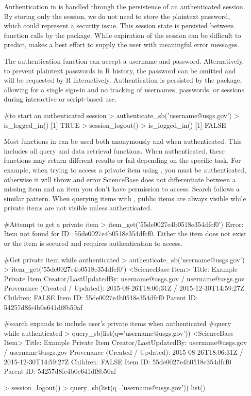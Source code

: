 Authentication in  is handled through the persistence of 
an authenticated session. By storing only the session, we do not need to 
store the plaintext password, which could represent a security issue. This
session state is persisted between function calls by the package. While  
expiration of the session can be difficult to predict, 
makes a best effort to supply the user with meaningful error messages.

The authentication function  can accept a username
and password. Alternatively, to prevent plaintext passwords in R history, 
the password can be omitted and will be requested by R interactively. 
Authentication is persisted by the package, allowing for a single sign-in
and no tracking of usernames, passwords, or sessions during interactive or
script-based use. 

\begin{example}
#to start an authenticated session
> authenticate_sb('username@usgs.gov')
> is_logged_in()
[1] TRUE
> session_logout()
> is_logged_in()
[1] FALSE
\end{example}

Most functions in  can be used both anonymously and when
authenticated. This includes all query and data retrieval functions. 
When authenticated, these functions may return different results or fail
depending on the specific task. For example, when trying to access 
a private item using , you must be authenticated, otherwise
it will throw and error ScienceBase does not differentiate between a missing
item and an item you don't have permission to access. Search follows a similar
pattern. When querying items with , public items are always 
visible while private items are not visible unless authenticated. 

\begin{example}
#Attempt to get a private item
> item_get('55de0027e4b0518e354dfcf0')
 Error: Item not found for ID=55de0027e4b0518e354dfcf0. Either the 
 item does not exist or the item is secured and requires authentication to access. 

#Get private item while authenticated
> authenticate_sb('username@usgs.gov')
> item_get('55de0027e4b0518e354dfcf0')
 <ScienceBase Item> 
  Title: Example Private Item
  Creator/LastUpdatedBy:     username@usgs.gov / username@usgs.gov
  Provenance (Created / Updated):  2015-08-26T18:06:31Z / 2015-12-30T14:59:27Z
  Children: FALSE
  Item ID: 55de0027e4b0518e354dfcf0
  Parent ID: 54257d8fe4b0e641df8b50af
  
#search expands to include user's private items when authenticated
#query while authenticated
> query_sb(list(q='username@usgs.gov'))
 <ScienceBase Item> 
  Title: Example Private Item
  Creator/LastUpdatedBy:     username@usgs.gov / username@usgs.gov
  Provenance (Created / Updated):  2015-08-26T18:06:31Z / 2015-12-30T14:59:27Z
  Children: FALSE
  Item ID: 55de0027e4b0518e354dfcf0
  Parent ID: 54257d8fe4b0e641df8b50af
  
> session_logout()
> query_sb(list(q='username@usgs.gov'))
list()
\end{example}

